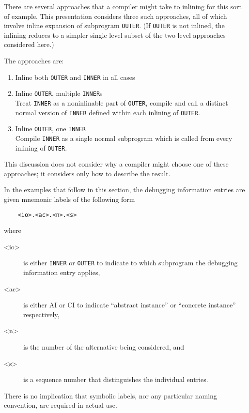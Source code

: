 There are several approaches that a compiler might take to
inlining for this sort of example. This presentation considers
three such approaches, all of which involve inline expansion
of subprogram \texttt{OUTER}. (If \texttt{OUTER} is not inlined, the inlining
reduces to a simpler single level subset of the two level
approaches considered here.)

The approaches are:
\begin{enumerate}[1. ]
\item  Inline both \texttt{OUTER} and \texttt{INNER} in all cases

\item Inline \texttt{OUTER}, multiple \texttt{INNER}s \\
Treat \texttt{INNER} as a non\dash inlinable part of \texttt{OUTER}, compile and
call a distinct normal version of \texttt{INNER} defined within each
inlining of \texttt{OUTER}.

\item Inline \texttt{OUTER}, one \texttt{INNER} \\
Compile \texttt{INNER} as a single normal subprogram which is called
from every inlining of \texttt{OUTER}.
\end{enumerate}

This discussion does not consider why a compiler might choose
one of these approaches; it considers only how to describe
the result.

In the examples that follow in this section, the debugging
information entries are given mnemonic labels of the following
form
\begin{verbatim}
    <io>.<ac>.<n>.<s>
\end{verbatim}
where
\begin{description}
\item[\textless io\textgreater]
is either \texttt{INNER} or \texttt{OUTER} to indicate to which
subprogram the debugging information entry applies, 
\item[\textless ac\textgreater]
is either AI or CI to indicate ``abstract instance'' or
``concrete instance'' respectively, 
\item[\textless n\textgreater]
is the number of the
alternative being considered, and 
\item[\textless s\textgreater]
is a sequence number that
distinguishes the individual entries. 
\end{description}
There is no implication
that symbolic labels, nor any particular naming convention,
are required in actual use.

